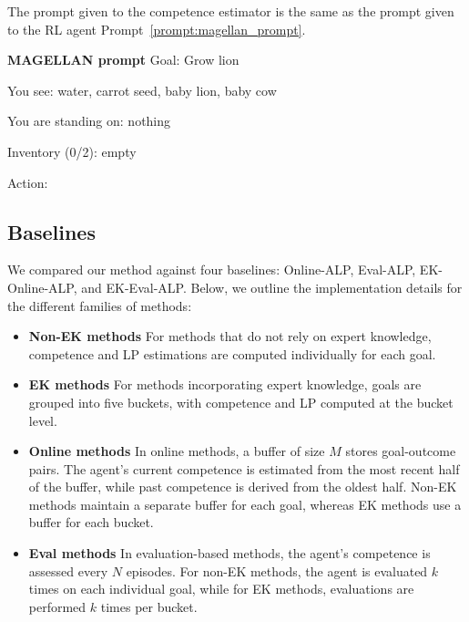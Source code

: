 The prompt given to the competence estimator is the same as the prompt given to the RL agent Prompt~\ref{prompt:magellan_prompt}.

\begin{promptbox_magellan}{\textbf{MAGELLAN prompt}} \label{prompt:magellan_prompt}
Goal: Grow lion

You see: water, carrot seed, baby lion, baby cow

You are standing on: nothing

Inventory (0/2): empty

Action: 
\end{promptbox_magellan}



\subsection{Baselines}
\label{app:implementation_details_baselines}


We compared our method against four baselines: Online-ALP, Eval-ALP, EK-Online-ALP, and EK-Eval-ALP. Below, we outline the implementation details for the different families of methods:

\begin{itemize}

\item \textbf{Non-EK methods}  
For methods that do not rely on expert knowledge, competence and LP estimations are computed individually for each goal.  

\item \textbf{EK methods}  
For methods incorporating expert knowledge, goals are grouped into five buckets, with competence and LP computed at the bucket level.  

\item \textbf{Online methods}  
In online methods, a buffer of size \( M \) stores goal-outcome pairs. The agent's current competence is estimated from the most recent half of the buffer, while past competence is derived from the oldest half. Non-EK methods maintain a separate buffer for each goal, whereas EK methods use a buffer for each bucket.  

\item \textbf{Eval methods}  
In evaluation-based methods, the agent's competence is assessed every \( N \) episodes. For non-EK methods, the agent is evaluated \( k \) times on each individual goal, while for EK methods, evaluations are performed \( k \) times per bucket.

\end{itemize}

